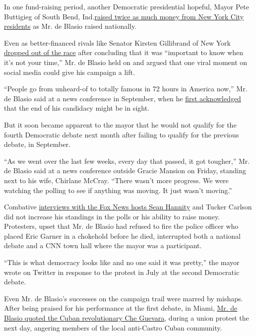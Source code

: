 In one fund-raising period, another Democratic presidential hopeful,
Mayor Pete Buttigieg of South Bend,
Ind.\href{https://www.nytimes.com/2019/03/25/nyregion/pete-buttigieg-2020-de-blasio-mayor.html}{raised
twice as much money from New York City residents} as Mr. de Blasio
raised nationally.

Even as better-financed rivals like Senator Kirsten Gillibrand of New
York
\href{https://www.nytimes.com/aponline/2019/08/28/us/politics/ap-us-election-2020-gillibrand.html}{dropped
out of the race} after concluding that it was ``important to know when
it's not your time,'' Mr. de Blasio held on and argued that one viral
moment on social media could give his campaign a lift.

``People go from unheard-of to totally famous in 72 hours in America
now,'' Mr. de Blasio said at a news conference in September, when he
\href{https://www.nytimes.com/2019/09/04/nyregion/de-blasio-2020-president.html}{first
acknowledged} that the end of his candidacy might be in sight.

But it soon became apparent to the mayor that he would not qualify for
the fourth Democratic debate next month after failing to qualify for the
previous debate, in September.

``As we went over the last few weeks, every day that passed, it got
tougher,'' Mr. de Blasio said at a news conference outside Gracie
Mansion on Friday, standing next to his wife, Chirlane McCray. ``There
wasn't more progress. We were watching the polling to see if anything
was moving. It just wasn't moving.''

Combative
\href{https://www.nytimes.com/2019/08/08/nyregion/de-blasio-sean-hannity-fox-news.html?rref=collection\%2Fbyline\%2Fjeffery-c.-mays\&action=click\&contentCollection=undefined\&region=stream\&module=stream_unit\&version=latest\&contentPlacement=7\&pgtype=collection}{interviews
with the Fox News hosts Sean Hannity} and Tucker Carlson did not
increase his standings in the polls or his ability to raise money.
Protesters, upset that Mr. de Blasio had refused to fire the police
officer who placed Eric Garner in a chokehold before he died,
interrupted both a national debate and a CNN town hall where the mayor
was a participant.

``This is what democracy looks like and no one said it was pretty,'' the
mayor wrote on Twitter in response to the protest in July at the second
Democratic debate.

Even Mr. de Blasio's successes on the campaign trail were marred by
mishaps. After being praised for his performance at the first debate, in
Miami,
\href{https://www.nytimes.com/2019/06/28/nyregion/de-blasio-che-guevara.html}{Mr.
de Blasio quoted the Cuban revolutionary Che Guevara}, during a union
protest the next day, angering members of the local anti-Castro Cuban
community.

